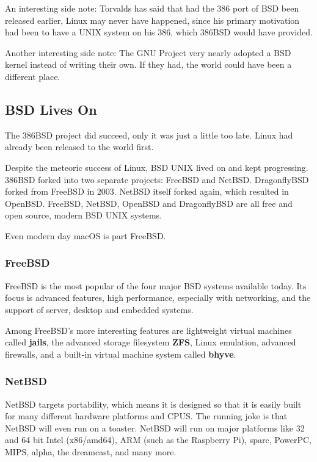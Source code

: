 An interesting side note: Torvalds has said that had the 386 port of BSD been released earlier, Linux may never have happened, since his primary motivation had been to have a UNIX system on his 386, which 386BSD would have provided.

Another interesting side note: The GNU Project very nearly adopted a BSD kernel instead of writing their own. If they had, the world could have been a different place.

\subsection{BSD Lives On}

The 386BSD project did succeed, only it was just a little too late.  Linux had already been released to the world first.  

Despite the meteoric success of Linux, BSD UNIX lived on and kept progressing. 386BSD forked into two separate projects: FreeBSD and NetBSD.  DragonflyBSD forked from FreeBSD in 2003.  NetBSD itself forked again, which resulted in OpenBSD.  FreeBSD, NetBSD, OpenBSD and DragonflyBSD are all free and open source, modern BSD UNIX systems.

Even modern day macOS is part FreeBSD. 

\subsubsection{FreeBSD}

FreeBSD is the most popular of the four major BSD systems available today.  Its focus is advanced features, high performance, especially with networking, and the support of server, desktop and embedded systems.

Among FreeBSD's more interesting features are lightweight virtual machines called \textbf{jails}, the advanced storage filesystem \textbf{ZFS}, Linux emulation, advanced firewalls, and a built-in virtual machine system called \textbf{bhyve}.

\subsubsection{NetBSD}

NetBSD targets portability, which means it is designed so that it is easily built for many different hardware platforms and CPUS.  The running joke is that NetBSD will even run on a toaster. NetBSD will run on major platforms like 32 and 64 bit Intel (x86/amd64), ARM (such as the Raspberry Pi), sparc, PowerPC, MIPS, alpha, the dreamcast, and many more.

